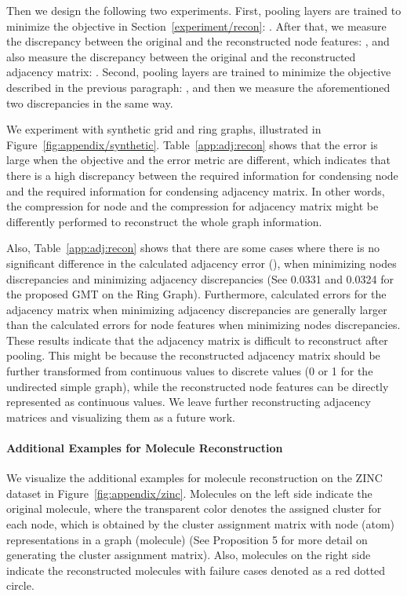 Then we design the following two experiments. First, pooling layers are trained to minimize the objective in Section~\ref{experiment/recon}: . After that, we measure the discrepancy between the original and the reconstructed node features: , and also measure the discrepancy between the original and the reconstructed adjacency matrix: . Second, pooling layers are trained to minimize the objective described in the previous paragraph: , and then we measure the aforementioned two discrepancies in the same way.

We experiment with synthetic grid and ring graphs, illustrated in Figure~\ref{fig:appendix/synthetic}. Table~\ref{app:adj:recon} shows that the error is large when the objective and the error metric are different, which indicates that there is a high discrepancy between the required information for condensing node and the required information for condensing adjacency matrix. In other words, the compression for node and the compression for adjacency matrix might be differently performed to reconstruct the whole graph information. 

Also, Table~\ref{app:adj:recon} shows that there are some cases where there is no significant difference in the calculated adjacency error (), when minimizing nodes discrepancies and minimizing adjacency discrepancies (See 0.0331 and 0.0324 for the proposed GMT on the Ring Graph). Furthermore, calculated errors for the adjacency matrix when minimizing adjacency discrepancies are generally larger than the calculated errors for node features when minimizing nodes discrepancies. These results indicate that the adjacency matrix is difficult to reconstruct after pooling. This might be because the reconstructed adjacency matrix should be further transformed from continuous values to discrete values (0 or 1 for the undirected simple graph), while the reconstructed node features can be directly represented as continuous values. We leave further reconstructing adjacency matrices and visualizing them as a future work.



\paragraph{Additional Examples for Molecule Reconstruction}
We visualize the additional examples for molecule reconstruction on the ZINC dataset in Figure~\ref{fig:appendix/zinc}. Molecules on the left side indicate the original molecule, where the transparent color denotes the assigned cluster for each node, which is obtained by the cluster assignment matrix  with node (atom) representations in a graph (molecule) (See Proposition 5 for more detail on generating the cluster assignment matrix). Also, molecules on the right side indicate the reconstructed molecules with failure cases denoted as a red dotted circle. 


